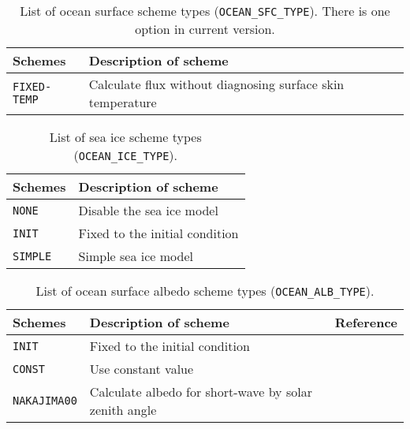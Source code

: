 \begin{table}[h]
\begin{center}
  \caption{List of ocean surface scheme types (\texttt{OCEAN\_SFC\_TYPE}). There is one option in current version.}
  \label{tab:nml_ocean_sfc}
  \begin{tabularx}{150mm}{lX} \hline
    \rowcolor[gray]{0.9}  Schemes & Description of scheme \\ \hline
      \verb|FIXED-TEMP| & Calculate flux without diagnosing surface skin temperature \\
    \hline
  \end{tabularx}
\end{center}
\end{table}

\begin{table}[h]
\begin{center}
  \caption{List of sea ice scheme types (\texttt{OCEAN\_ICE\_TYPE}).}
  \label{tab:nml_ocean_ice}
  \begin{tabularx}{150mm}{lX} \hline
    \rowcolor[gray]{0.9}  Schemes & Description of scheme \\ \hline
      \verb|NONE|   & Disable the sea ice model \\
      \verb|INIT|   & Fixed to the initial condition \\
      \verb|SIMPLE| & Simple sea ice model \\
    \hline
  \end{tabularx}
\end{center}
\end{table}

\begin{table}[h]
\begin{center}
  \caption{List of ocean surface albedo scheme types (\texttt{OCEAN\_ALB\_TYPE}).}
  \label{tab:nml_ocean_alb}
  \begin{tabularx}{150mm}{llX} \hline
    \rowcolor[gray]{0.9}  Schemes & Description of scheme & Reference \\ \hline
      \verb|INIT|       & Fixed to the initial condition \\
      \verb|CONST|      & Use constant value \\
      \verb|NAKAJIMA00| & Calculate albedo for short-wave by solar zenith angle & \citet{nakajima_2000} \\
    \hline
  \end{tabularx}
\end{center}
\end{table}

